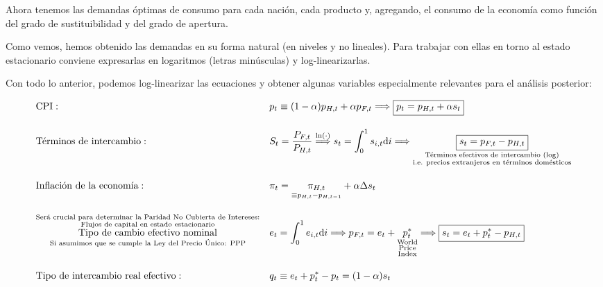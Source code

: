 \documentclass[10pt,a4paper]{article}
\begin{document}
Ahora tenemos las demandas óptimas de consumo para cada nación, cada producto y, agregando, el consumo de la economía como función del grado de sustituibilidad y del grado de apertura.

Como vemos, hemos obtenido las demandas en su forma natural (en niveles y no lineales). Para trabajar con ellas en torno al estado estacionario conviene expresarlas en logaritmos (letras minúsculas) y log-linearizarlas.

Con todo lo anterior, podemos log-linearizar las ecuaciones y obtener algunas variables especialmente relevantes para el  análisis posterior:

$$\begin{aligned}
    &\text{CPI}:&&p_t\equiv(1-\alpha)p_{H,t}+\alpha p_{F,t}\Longrightarrow {\boxed{p_t=p_{H,t}+\alpha s_t}}\\[1em]
    &\text{Términos de intercambio}:&&S_t=\frac{P_{F,t}}{P_{H,t}}\overset{\ln(\cdot)}{\Longrightarrow}s_t=\int_0^1s_{i,t}\mathrm di\Longrightarrow \underset{\substack{\text{\scriptsize Términos efectivos de intercambio (log)}\\\text{\scriptsize i.e. precios extranjeros en términos domésticos}}}{\boxed{s_t=p_{F,t}-p_{H,t}}}\\[1em]
    &\text{Inflación de la economía}: &&\pi_{t}=\underset{\equiv p_{H,t}-p_{H,t-1}}{\pi_{H,t}}+\alpha\Delta s_t\\[1em]
    &\overset{\substack{\text{\scriptsize Será crucial para determinar la Paridad No Cubierta de Intereses:}\\\text{\scriptsize Flujos de capital en estado estacionario}}}{\underset{\text{\scriptsize Si asumimos que se cumple la Ley del Precio Único: PPP}}{\text{Tipo de cambio efectivo nominal}}}&& e_t=\int_0^1e_{i,t}\mathrm di\Longrightarrow p_{F,t}=e_t+\underset{\substack{\text{\scriptsize World}\\\text{\scriptsize Price}\\\text{\scriptsize Index}}}{p_t^*}\Longrightarrow \boxed{s_t=e_t+p_t^*-p_{H,t}}\\[1em]
    &{\text{Tipo de intercambio real efectivo}:}&&q_t\equiv e_t+p_t^*-p_t=(1-\alpha)s_t
\end{aligned}$$
\end{document}
